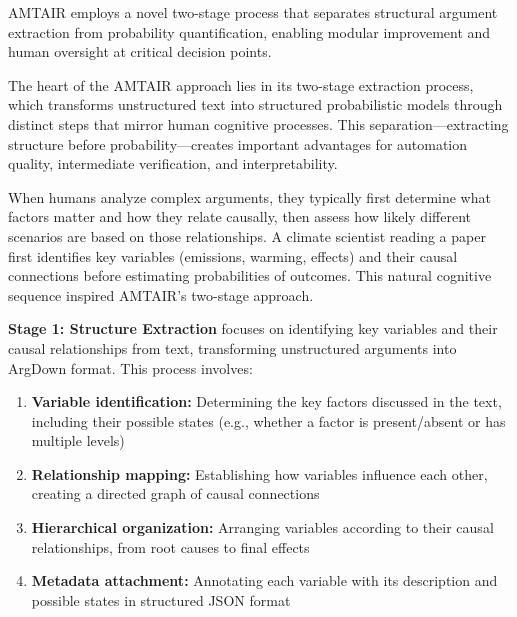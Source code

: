 \documentclass[
  11pt,
  letterpaper,
]{book}
\begin{document}
\begin{tcolorbox}[enhanced jigsaw, toprule=.15mm, colbacktitle=quarto-callout-tip-color!10!white, opacitybacktitle=0.6, leftrule=.75mm, coltitle=black, rightrule=.15mm, opacityback=0, bottomtitle=1mm, title=\textcolor{quarto-callout-tip-color}{\faLightbulb}\hspace{0.5em}{The Two-Stage Extraction Process}, toptitle=1mm, breakable, titlerule=0mm, left=2mm, arc=.35mm, colframe=quarto-callout-tip-color-frame, bottomrule=.15mm, colback=white]

AMTAIR employs a novel two-stage process that separates structural
argument extraction from probability quantification, enabling modular
improvement and human oversight at critical decision points.

\end{tcolorbox}

The heart of the AMTAIR approach lies in its two-stage extraction
process, which transforms unstructured text into structured
probabilistic models through distinct steps that mirror human cognitive
processes. This separation---extracting structure before
probability---creates important advantages for automation quality,
intermediate verification, and interpretability.

When humans analyze complex arguments, they typically first determine
what factors matter and how they relate causally, then assess how likely
different scenarios are based on those relationships. A climate
scientist reading a paper first identifies key variables (emissions,
warming, effects) and their causal connections before estimating
probabilities of outcomes. This natural cognitive sequence inspired
AMTAIR's two-stage approach.

\textbf{Stage 1: Structure Extraction} focuses on identifying key
variables and their causal relationships from text, transforming
unstructured arguments into ArgDown format. This process involves:

\begin{enumerate}
\def\labelenumi{\arabic{enumi}.}
\item
  \textbf{Variable identification:} Determining the key factors
  discussed in the text, including their possible states (e.g., whether
  a factor is present/absent or has multiple levels)
\item
  \textbf{Relationship mapping:} Establishing how variables influence
  each other, creating a directed graph of causal connections
\item
  \textbf{Hierarchical organization:} Arranging variables according to
  their causal relationships, from root causes to final effects
\item
  \textbf{Metadata attachment:} Annotating each variable with its
  description and possible states in structured JSON format
\end{enumerate}
\end{document}
